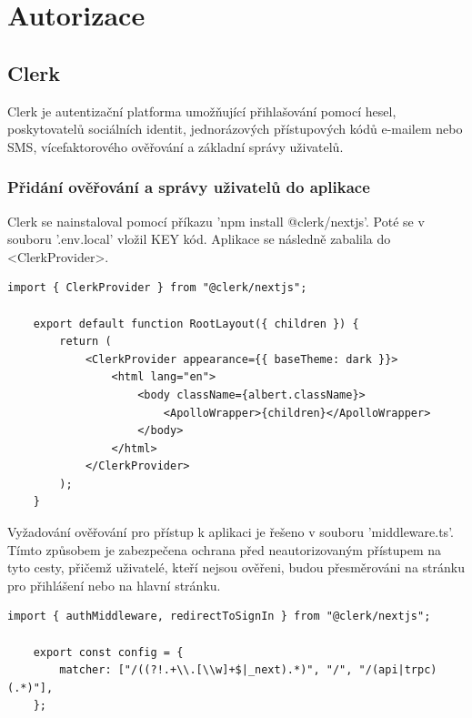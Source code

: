 \documentclass[12pt, a4paper,
oneside,      %
openright
]{report}
\begin{document}
\section{Autorizace}

\subsection{Clerk}
Clerk je autentizační platforma umožňující přihlašování pomocí hesel, poskytovatelů sociálních identit, jednorázových přístupových kódů e-mailem nebo SMS, vícefaktorového ověřování a základní správy uživatelů.

\subsubsection{Přidání ověřování a správy uživatelů do aplikace}
Clerk se nainstaloval pomocí příkazu 'npm install @clerk/nextjs'. Poté se v souboru '.env.local' vložil KEY kód. Aplikace se následně zabalila do <ClerkProvider>. 

\vspace{10pt}

\begin{lstlisting}[style=JavaScript, title={Kód}, caption={Ukázka <ClerkProvider> v layout.js}] 
	import { ClerkProvider } from "@clerk/nextjs";
	
	export default function RootLayout({ children }) {
		return (
			<ClerkProvider appearance={{ baseTheme: dark }}>
				<html lang="en">
					<body className={albert.className}>
						<ApolloWrapper>{children}</ApolloWrapper>
					</body>
				</html>
			</ClerkProvider>
		);
	}
\end{lstlisting}

\vspace{10pt}

Vyžadování ověřování pro přístup k aplikaci je řešeno v souboru 'middleware.ts'. Tímto způsobem je zabezpečena ochrana před neautorizovaným přístupem na tyto cesty, přičemž uživatelé, kteří nejsou ověřeni, budou přesměrováni na stránku pro přihlášení nebo na hlavní stránku.

\vspace{10pt}

\begin{lstlisting}[style=JavaScript, title={Kód}, caption={Ukázka kódu v middleware.ts}] 
	import { authMiddleware, redirectToSignIn } from "@clerk/nextjs";
	
	export const config = {
		matcher: ["/((?!.+\\.[\\w]+$|_next).*)", "/", "/(api|trpc)(.*)"],
	};
\end{lstlisting}
\end{document}
